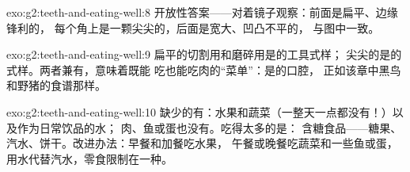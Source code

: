 \begin{solution}{exo:g2:teeth-and-eating-well:8}
开放性答案——对着镜子观察：前面是扁平、边缘锋利的，
每个角上是一颗尖尖的，后面是宽大、凹凸不平的，
与图中一致。
\end{solution}

\begin{solution}{exo:g2:teeth-and-eating-well:9}
扁平的切割用和磨碎用是的工具式样；
尖尖的是的式样。两者兼有，意味着既能
吃也能吃肉的“菜单”：是的口腔，
正如该章中黑鸟和野猪的食谱那样。
\end{solution}

\begin{solution}{exo:g2:teeth-and-eating-well:10}
缺少的有：水果和蔬菜（一整天一点都没有！）以及作为日常饮品的水；
肉、鱼或蛋也没有。吃得太多的是：
含糖食品——糖果、汽水、饼干。改进办法：早餐和加餐吃水果，
午餐或晚餐吃蔬菜和一些鱼或蛋，
用水代替汽水，零食限制在一种。
\end{solution}
